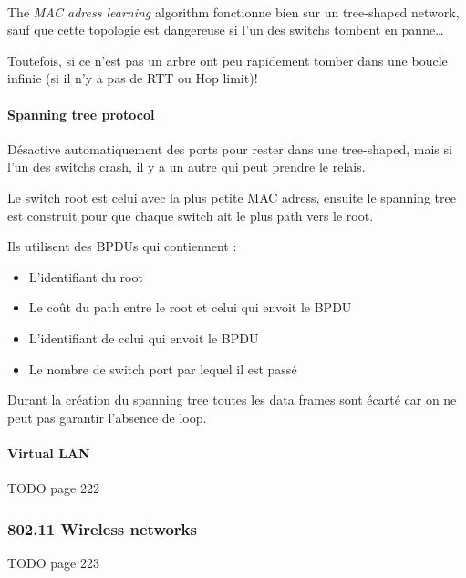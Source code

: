 \paragraph{ }
The \textit{MAC adress learning} algorithm fonctionne bien sur un tree-shaped network,
sauf que cette topologie est dangereuse si l'un des switchs tombent en panne\ldots

Toutefois, si ce n'est pas un arbre ont peu rapidement tomber dans une boucle infinie
(si il n'y a pas de RTT ou Hop limit)!

\paragraph{Spanning tree protocol}
Désactive automatiquement des ports pour rester dans une tree-shaped, mais si l'un
des switchs crash, il y a un autre qui peut prendre le relais.

Le switch root est celui avec la plus petite MAC adress, ensuite le spanning tree est construit
pour que chaque switch ait le plus path vers le root.

Ils utilisent des BPDUs qui contiennent :
\begin{itemize}
    \item L'identifiant du root
    \item Le coût du path entre le root et celui qui envoit le BPDU
    \item L'identifiant de celui qui envoit le BPDU
    \item Le nombre de switch port par lequel il est passé
\end{itemize}


Durant la création du spanning tree toutes les data frames sont écarté
car on ne peut pas garantir l'absence de loop.


\paragraph{Virtual LAN}

TODO page 222

\subsubsection{802.11 Wireless networks}

TODO page 223

\biblio


